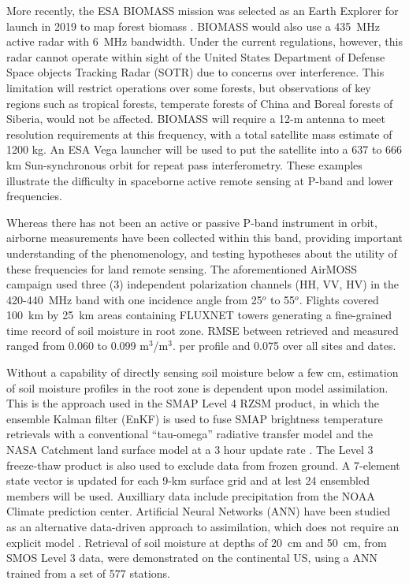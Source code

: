 \documentclass[draftcls,onecolumn]{IEEEtran}  %
\begin{document}
More recently, the ESA BIOMASS mission was selected as an Earth Explorer for launch in 2019 to map forest biomass \cite{Esa2012}.
BIOMASS would also use a 435~MHz active radar with 6~MHz bandwidth.
Under the current regulations, however, this radar cannot operate within sight of the United States Department of Defense Space objects Tracking Radar (SOTR) due to concerns over interference.  
This limitation will restrict operations over some forests, but observations of key regions such as  tropical forests, temperate forests of China and Boreal forests of Siberia, would not be affected. 
BIOMASS will require a  12-m antenna to meet resolution requirements at this frequency, with a total satellite mass estimate of 1200 kg. 
An ESA Vega launcher will be used to put the satellite into a 637 to 666 km Sun-synchronous orbit for repeat pass interferometry. 
These examples illustrate the  difficulty in spaceborne active remote sensing at P-band and lower frequencies. 

Whereas there has not been an active or passive P-band instrument in orbit, airborne measurements have been collected within this band, providing important understanding of the phenomenology, and testing hypotheses about the utility of these frequencies for land remote sensing. 
The aforementioned AirMOSS campaign \cite{Tabatabaeenejad2015} used three (3) independent polarization channels (HH, VV, HV) in the 420-440~MHz band with one incidence angle from 25$^o$ to 55$^o$. 
Flights  covered 100~km by 25~km areas containing FLUXNET towers generating a fine-grained time record of soil moisture in root zone. 
RMSE between retrieved and measured ranged from 0.060 to 0.099 m$^3$/m$^3$. per profile and 0.075 over all sites and dates.


Without a capability of directly sensing soil moisture below a few cm, estimation of soil moisture profiles in the root zone is dependent upon model assimilation. 
This is the approach used in the SMAP Level 4 RZSM product, in which the ensemble Kalman filter (EnKF) is used to fuse SMAP brightness temperature retrievals with a conventional ``tau-omega'' radiative transfer model and the NASA Catchment land surface model at a 3 hour update rate \cite{Reichle2012}.
The Level 3 freeze-thaw product is also used to exclude data from frozen ground. 
A 7-element state vector is updated for each 9-km surface grid and at lest 24 ensembled members will be used. 
Auxilliary data include precipitation from the NOAA Climate prediction center. 
Artificial Neural Networks (ANN) have been studied as an alternative data-driven approach to assimilation, which does not require an explicit model \cite{Pan2017}. 
Retrieval of soil moisture at depths of 20~cm and 50~cm, from SMOS Level 3 data, were demonstrated on the continental US, using a ANN trained from a set of 577 stations. 
\end{document}
